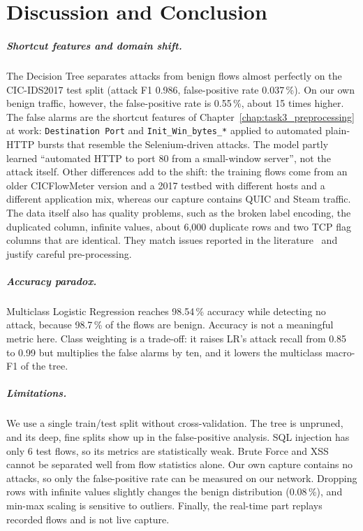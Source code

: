 \chapter{Discussion and Conclusion}\label{chap:discussion}

\paragraph{Shortcut features and domain shift.} The Decision Tree separates attacks from benign flows almost perfectly on the CIC-IDS2017 test split (attack F1 0.986, false-positive rate 0.037\,\%). On our own benign traffic, however, the false-positive rate is 0.55\,\%, about 15 times higher. The false alarms are the shortcut features of Chapter~\ref{chap:task3_preprocessing} at work: \texttt{Destination Port} and \texttt{Init\_Win\_bytes\_*} applied to automated plain-HTTP bursts that resemble the Selenium-driven attacks. The model partly learned ``automated HTTP to port 80 from a small-window server'', not the attack itself. Other differences add to the shift: the training flows come from an older CICFlowMeter version and a 2017 testbed with different hosts and a different application mix, whereas our capture contains QUIC and Steam traffic. The data itself also has quality problems, such as the broken label encoding, the duplicated column, infinite values, about 6,000 duplicate rows and two TCP flag columns that are identical. They match issues reported in the literature~\cite{engelen2021troubleshooting} and justify careful pre-processing.

\paragraph{Accuracy paradox.} Multiclass Logistic Regression reaches 98.54\,\% accuracy while detecting no attack, because 98.7\,\% of the flows are benign. Accuracy is not a meaningful metric here. Class weighting is a trade-off: it raises LR's attack recall from 0.85 to 0.99 but multiplies the false alarms by ten, and it lowers the multiclass macro-F1 of the tree.

\paragraph{Limitations.} We use a single train/test split without cross-validation. The tree is unpruned, and its deep, fine splits show up in the false-positive analysis. SQL injection has only 6 test flows, so its metrics are statistically weak. Brute Force and XSS cannot be separated well from flow statistics alone. Our own capture contains no attacks, so only the false-positive rate can be measured on our network. Dropping rows with infinite values slightly changes the benign distribution (0.08\,\%), and min-max scaling is sensitive to outliers. Finally, the real-time part replays recorded flows and is not live capture.

